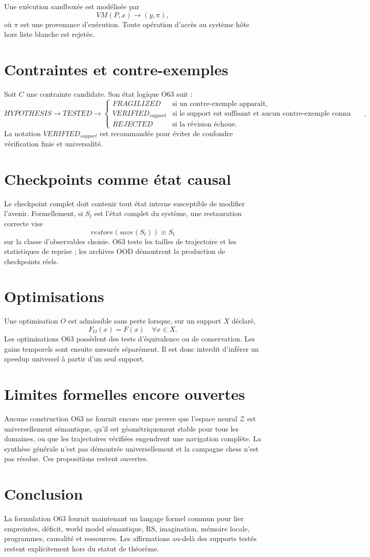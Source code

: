 \documentclass[11pt,a4paper]{article}
\newcommand{\Z}{\mathcal{Z}}
\begin{document}
Une exécution sandboxée est modélisée par
\[
VM(P,x)\to(y,\pi),
\]
où $\pi$ est une provenance d’exécution. Toute opération d’accès au système hôte hors liste blanche est rejetée.

\section{Contraintes et contre-exemples}
Soit $C$ une contrainte candidate. Son état logique O63 suit :
\[
HYPOTHESIS\to TESTED\to
\begin{cases}
FRAGILIZED & \text{si un contre-exemple apparaît},\\
VERIFIED_{support} & \text{si le support est suffisant et aucun contre-exemple connu n’existe},\\
REJECTED & \text{si la révision échoue}.
\end{cases}
\]
La notation $VERIFIED_{support}$ est recommandée pour éviter de confondre vérification finie et universalité.

\section{Checkpoints comme état causal}
Le checkpoint complet doit contenir tout état interne susceptible de modifier l’avenir. Formellement, si $S_t$ est l’état complet du système, une restauration correcte vise
\[
restore(save(S_t))\equiv S_t
\]
sur la classe d’observables choisie. O63 teste les tailles de trajectoire et les statistiques de reprise ; les archives OOD démontrent la production de checkpoints réels.

\section{Optimisations}
Une optimisation $O$ est admissible sans perte lorsque, sur un support $X$ déclaré,
\[
F_O(x)=F(x)\quad\forall x\in X.
\]
Les optimisations O63 possèdent des tests d’équivalence ou de conservation. Les gains temporels sont ensuite mesurés séparément. Il est donc interdit d’inférer un speedup universel à partir d’un seul support.

\section{Limites formelles encore ouvertes}
Aucune construction O63 ne fournit encore une preuve que l’espace neural $\Z$ est universellement sémantique, qu’il est géométriquement stable pour tous les domaines, ou que les trajectoires vérifiées engendrent une navigation complète. La synthèse générale n’est pas démontrée universellement et la campagne chess n’est pas résolue. Ces propositions restent ouvertes.

\section{Conclusion}
La formulation O63 fournit maintenant un langage formel commun pour lier empreintes, déficit, world model sémantique, RS, imagination, mémoire locale, programmes, causalité et ressources. Les affirmations au-delà des supports testés restent explicitement hors du statut de théorème.
\end{document}
